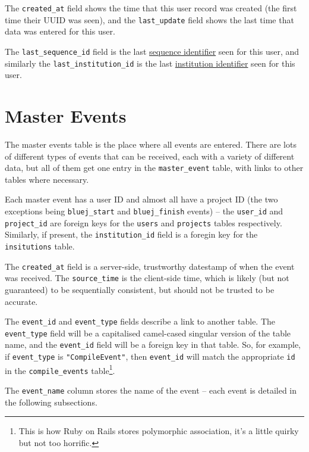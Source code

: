 \documentclass{book}
\begin{document}
The \texttt{created\_at} field shows the time that this user record was
created (the first time their UUID was seen), and the \texttt{last\_update} field shows the last time that data was entered for
this user.

The \texttt{last\_sequence\_id} field is the last \hyperref[def:sequence_id]{sequence identifier} seen for
this user, and similarly the \texttt{last\_institution\_id} is the last
\hyperref[def:institution_id]{institution identifier} seen for this user.

\section{Master Events}
\label{tab:master_events}

The master events table is the place where all events are entered.  There are
lots of different types of events that can be received, each with a variety of
different data, but all of them get one entry in the \texttt{master\_event}
table, with links to other tables where necessary.

Each master event has a user ID and almost all have a project ID (the two
exceptions being \texttt{bluej\_start} and \texttt{bluej\_finish} events) -- the
\texttt{user\_id} and \texttt{project\_id} are foreign keys for the
\texttt{users} and \texttt{projects} tables respectively.  Similarly, if
present, the \texttt{institution\_id} field is a foregin key for the
\texttt{insitutions} table.

The \texttt{created\_at} field is a server-side, trustworthy datestamp of when
the event was received.  The \texttt{source\_time} is the client-side time,
which is likely (but not guaranteed) to be sequentially consistent, but should
not be trusted to be accurate.

The \texttt{event\_id} and \texttt{event\_type} fields describe a link to
another table.  The \texttt{event\_type} field will be a capitalised
camel-cased singular version of the table name, and the \texttt{event\_id} field will
be a foreign key in that table.  So, for example, if \texttt{event\_type} is
\texttt{"CompileEvent"}, then \texttt{event\_id} will match the appropriate
\texttt{id} in the \texttt{compile\_events} table\footnote{This is how Ruby on
  Rails stores polymorphic association, it's a little quirky but not too
  horrific.}.

The \texttt{event\_name} column stores the name of the event -- each event is
detailed in the following subsections.
\end{document}
